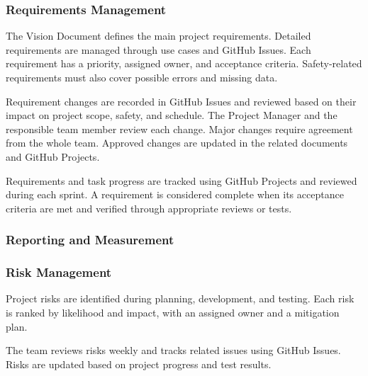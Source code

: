 \subsubsection{Requirements Management}

The Vision Document defines the main project requirements.
Detailed requirements are managed through use cases
and GitHub Issues. Each requirement has a priority,
assigned owner, and acceptance criteria.
Safety-related requirements must also cover possible
errors and missing data.

Requirement changes are recorded in GitHub Issues
and reviewed based on their impact on project scope,
safety, and schedule. The Project Manager and the
responsible team member review each change.
Major changes require agreement from the whole team.
Approved changes are updated in the related documents
and GitHub Projects.

Requirements and task progress are tracked using
GitHub Projects and reviewed during each sprint.
A requirement is considered complete when its
acceptance criteria are met and verified through
appropriate reviews or tests.


\subsubsection{Reporting and Measurement}


\subsubsection{Risk Management}

Project risks are identified during planning,
development, and testing. Each risk is ranked
by likelihood and impact, with an assigned owner
and a mitigation plan.

The team reviews risks weekly and tracks related
issues using GitHub Issues. Risks are updated
based on project progress and test results.

